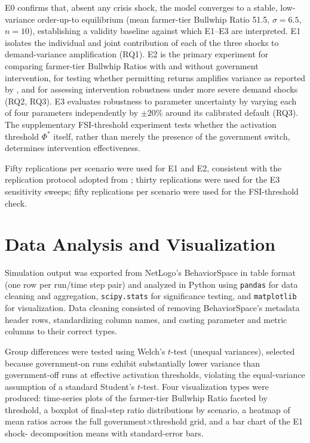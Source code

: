 \documentclass[final,onefignum,onetabnum]{siuro250211}
\begin{document}
E0 confirms that, absent any crisis shock, the model converges to a stable, low-variance
order-up-to equilibrium (mean farmer-tier Bullwhip Ratio 51.5, $\sigma=6.5$, $n=10$), establishing
a validity baseline against which E1--E3 are interpreted. E1 isolates the individual and joint
contribution of each of the three shocks to demand-variance amplification (RQ1). E2 is the primary
experiment for comparing farmer-tier Bullwhip Ratios with and without government intervention, for
testing whether permitting returns amplifies variance as reported by
\cite{ChatfieldPritchard2013}, and for assessing intervention robustness under more severe demand
shocks (RQ2, RQ3). E3 evaluates robustness to parameter uncertainty by varying each of four
parameters independently by $\pm20\%$ around its calibrated default (RQ3). The supplementary
FSI-threshold experiment tests whether the activation threshold $\Phi^{*}$ itself, rather than
merely the presence of the government switch, determines intervention effectiveness.

Fifty replications per scenario were used for E1 and E2, consistent with the replication protocol
adopted from \cite{ChatfieldPritchard2013}; thirty replications were used for the E3 sensitivity
sweeps; fifty replications per scenario were used for the FSI-threshold check.

\section{Data Analysis and Visualization}
\label{sec:analysis}

Simulation output was exported from NetLogo's BehaviorSpace in table format (one row per run/time
step pair) and analyzed in Python using \texttt{pandas} for data cleaning and aggregation,
\texttt{scipy.stats} for significance testing, and \texttt{matplotlib} for visualization. Data
cleaning consisted of removing BehaviorSpace's metadata header rows, standardizing column names,
and casting parameter and metric columns to their correct types.

Group differences were tested using Welch's $t$-test (unequal variances), selected because
government-on runs exhibit substantially lower variance than government-off runs at effective
activation thresholds, violating the equal-variance assumption of a standard Student's $t$-test.
Four visualization types were produced: time-series plots of the farmer-tier Bullwhip Ratio
faceted by threshold, a boxplot of final-step ratio distributions by scenario, a heatmap of mean
ratios across the full government$\times$threshold grid, and a bar chart of the E1 shock-
decomposition means with standard-error bars.
\end{document}
